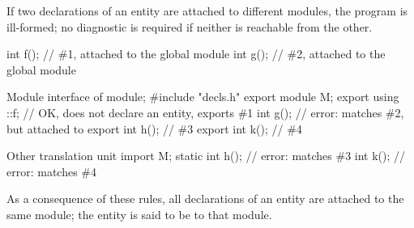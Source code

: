 \pnum
If two declarations of an entity are
attached to different modules, the program is ill-formed;
no diagnostic is required if neither is reachable from the other.
\begin{example}
\begin{codeblocktu}{}
int f();            // \#1, attached to the global module
int g();            // \#2, attached to the global module
\end{codeblocktu}

\begin{codeblocktu}{Module interface of }
module;
#include "decls.h"
export module M;
export using ::f;   // OK, does not declare an entity, exports \#1
int g();            // error: matches \#2, but attached to 
export int h();     // \#3
export int k();     // \#4
\end{codeblocktu}

\begin{codeblocktu}{Other translation unit}
import M;
static int h();     // error: matches \#3
int k();            // error: matches \#4
\end{codeblocktu}
\end{example}
As a consequence of these rules,
all declarations of an entity are attached to the same module;
the entity is said to be  to that module.

